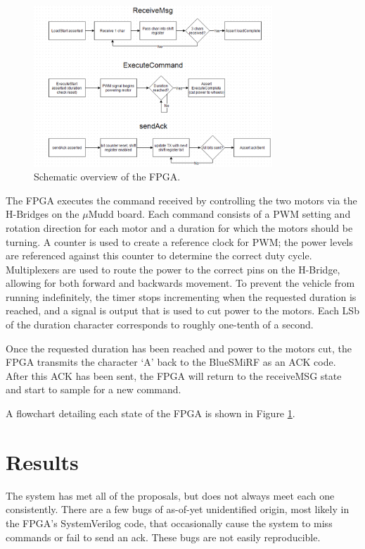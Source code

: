 \documentclass[12pt]{article}
\begin{document}
\begin{figure}
\begin{center}
\includegraphics[width=0.8\textwidth]{FPGABlock}
\end{center}
\caption{Schematic overview of the FPGA.}
\label{fig:fpgablock}
\end{figure}

The FPGA executes the command received by controlling the two motors via the H-Bridges on the $\mu$Mudd board. Each command consists of a PWM setting and rotation direction for each motor and a duration for which the motors should be turning.  A counter is used to create a reference clock for PWM; the power levels are referenced against this counter to determine the correct duty cycle.  Multiplexers are used to route the power to the correct pins on the H-Bridge, allowing for both forward and backwards movement.  To prevent the vehicle from running indefinitely, the timer stops incrementing when the requested duration is reached, and a signal is output that is used to cut power to the motors.  Each LSb of the duration character corresponds to roughly one-tenth of a second.

Once the requested duration has been reached and power to the motors cut, the FPGA transmits the character `A' back to the BlueSMiRF as an ACK code.  After this ACK has been sent, the FPGA will return to the receiveMSG state and start to sample for a new command.

A flowchart detailing each state of the FPGA is shown in Figure \ref{fig:fpgablock}.



\section{Results}

The system has met all of the proposals, but does not always meet each one consistently.  There are a few bugs of as-of-yet unidentified origin, most likely in the FPGA's SystemVerilog code, that occasionally cause the system to miss commands or fail to send an ack.  These bugs are not easily reproducible.
\end{document}
